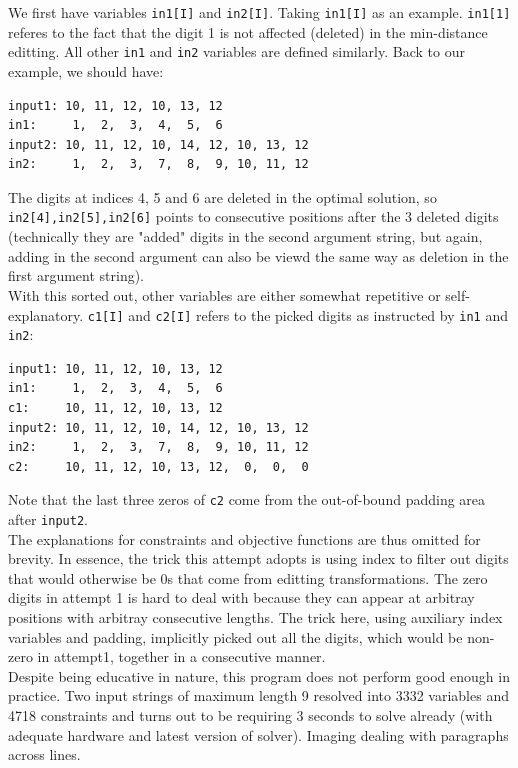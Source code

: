 \documentclass{article}
\begin{document}
We first have variables \texttt{in1[I]} and \texttt{in2[I]}. Taking \texttt{in1[I]} as an example. \texttt{in1[1]} referes to the fact that the digit 1 is not affected (deleted) in the min-distance editting. All other \texttt{in1} and \texttt{in2} variables are defined similarly. Back to our example, we should have:
\begin{lstlisting}
input1: 10, 11, 12, 10, 13, 12
in1:     1,  2,  3,  4,  5,  6
input2: 10, 11, 12, 10, 14, 12, 10, 13, 12
in2:     1,  2,  3,  7,  8,  9, 10, 11, 12 
\end{lstlisting}
The digits at indices 4, 5 and 6 are deleted in the optimal solution, so \texttt{in2[4],in2[5],in2[6]} points to consecutive positions after the 3 deleted digits (technically they are "added" digits in the second argument string, but again, adding in the second argument can also be viewd the same way as deletion in the first argument string). \\

With this sorted out, other variables are either somewhat repetitive or self-explanatory. \texttt{c1[I]} and \texttt{c2[I]} refers to the picked digits as instructed by \texttt{in1} and \texttt{in2}:
\begin{lstlisting}
input1: 10, 11, 12, 10, 13, 12
in1:     1,  2,  3,  4,  5,  6
c1:     10, 11, 12, 10, 13, 12
input2: 10, 11, 12, 10, 14, 12, 10, 13, 12
in2:     1,  2,  3,  7,  8,  9, 10, 11, 12 
c2:     10, 11, 12, 10, 13, 12,  0,  0,  0
\end{lstlisting}
Note that the last three zeros of \texttt{c2} come from the out-of-bound padding area after \texttt{input2}. \\

The explanations for constraints and objective functions are thus omitted for brevity. In essence, the trick this attempt adopts is using index to filter out digits that would otherwise be 0s that come from editting transformations. The zero digits in attempt 1 is hard to deal with because they can appear at arbitray positions with arbitray consecutive lengths. The trick here, using auxiliary index variables and padding, implicitly picked out all the digits, which would be non-zero in attempt1, together in a consecutive manner. \\

Despite being educative in nature, this program does not perform good enough in practice. Two input strings of maximum length 9 resolved into 3332 variables and 4718 constraints and turns out to be requiring 3 seconds to solve already (with adequate hardware and latest version of solver). Imaging dealing with paragraphs across lines. \\
\end{document}
